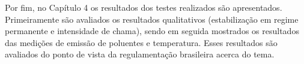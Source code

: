 Por fim, no Capítulo 4 os resultados dos testes realizados são apresentados. Primeiramente são avaliados os resultados qualitativos (estabilização em regime permanente e intensidade de chama), sendo em seguida mostrados os resultados das medições de emissão de poluentes e temperatura. Esses resultados são avaliados do ponto de vista da regulamentação brasileira acerca do tema.












